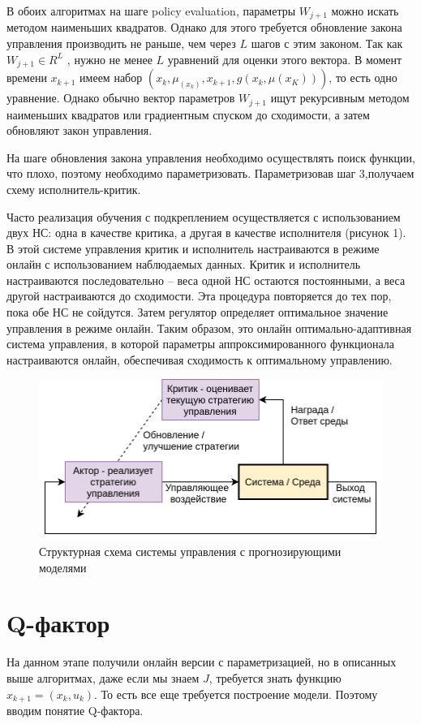В обоих алгоритмах на шаге policy evaluation, параметры $W_{j + 1}$ можно искать методом наименьших квадратов. Однако для этого требуется обновление закона управления производить не раньше, чем через $L$ шагов с этим законом. Так как $W_{j + 1} \in R^L$ , нужно не менее $L$ уравнений для оценки этого вектора. В момент времени $x_{k+1}$ имеем набор $(x_k , \mu_(x_k), x_{k+1} , g(x_k , \mu(x_K)))$, то есть одно уравнение. Однако обычно вектор параметров $W_{j + 1}$ ищут рекурсивным методом наименьших квадратов или градиентным спуском до сходимости, а затем обновляют закон управления.

На шаге обновления закона управления необходимо осуществлять поиск функции, что плохо, поэтому необходимо параметризовать. Параметризовав шаг 3,получаем схему исполнитель-критик.

Часто реализация обучения с подкреплением осуществляется с использованием двух НС: одна в качестве критика, а другая в качестве исполнителя (рисунок 1). В этой системе управления критик и исполнитель настраиваются в режиме онлайн с использованием наблюдаемых данных. Критик и исполнитель настраиваются последовательно -- веса одной НС остаются постоянными, а веса другой настраиваются до сходимости. Эта процедура повторяется до тех пор, пока обе НС не сойдутся. Затем регулятор определяет оптимальное значение управления в режиме онлайн. Таким образом,
это онлайн оптимально-адаптивная система управления, в которой параметры аппроксимированного функционала настраиваются онлайн, обеспечивая сходимость к оптимальному управлению.
%
\begin{figure}[ht!] 
	\centering
	\includegraphics[width=0.8\linewidth]{my_folder/figure/schema/actor_critic.png}
	\caption{Структурная схема системы управления с прогнозирующими моделями}
	\label{fig:my_label}
\end{figure}
%
%
\section{Q-фактор}
На данном этапе получили онлайн версии с параметризацией, но в описанных выше алгоритмах, даже если мы знаем $J$, требуется знать функцию $x_{k+1} = (x_k, u_k)$. То есть все еще требуется построение модели. Поэтому вводим понятие Q-фактора.

